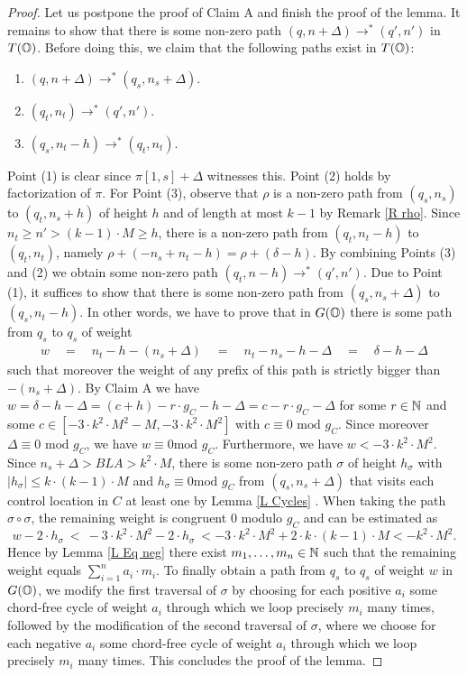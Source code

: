 \documentclass[times,envcountsame]{llncs}
\begin{document}
\begin{proof}
\noindent
Let us postpone the proof of Claim A and finish the proof of the lemma.
It remains to show that there is some non-zero path
$(q,n+\Delta)\rightarrow^*(q',n')$ in $T(\mathbb{O})$.
Before doing this, we claim that the following paths exist in $T(\mathbb{O})$:
\begin{enumerate}[(1)]
\item $(q,n+\Delta)\rightarrow^*(q_s,n_s+\Delta)$.
\item $(q_t,n_t)\rightarrow^*(q',n')$.
\item $(q_s,n_t-h)\rightarrow^*(q_t,n_t)$.
\end{enumerate}
Point (1) is clear since $\pi[1,s]+\Delta$ witnesses this.
Point (2) holds by factorization of $\pi$.
For Point (3), observe that $\rho$ is a non-zero path from $(q_s,n_s)$ to $(q_t,n_s+h)$
of height $h$ and of length at most $k-1$
by Remark \ref{R rho}.
Since $n_t\geq n'>(k-1)\cdot M\geq h$, there is a non-zero path
from $(q_t,n_t-h)$ to $(q_t,n_t)$, namely
$\rho+(-n_s+n_t-h)=\rho+(\delta-h)$.
 By combining Points (3) and (2) we obtain some non-zero path $(q_t,n-h)\rightarrow^*
(q',n')$.
Due to Point (1), it suffices to show that there is some
non-zero path from $(q_s,n_s+\Delta)$ to $(q_s,n_t-h)$.
In other words, we have to prove that in $G(\mathbb{O})$ there is some path from
$q_s$ to $q_s$ of weight
\begin{eqnarray*}
w\quad=\quad n_t-h-(n_s+\Delta)\quad=\quad n_t-n_s-h-\Delta\quad=\quad\delta-h-\Delta
\end{eqnarray*}
such that moreover the weight of any prefix of this path is strictly bigger
than $-(n_s+\Delta)$.
By Claim A we have $w=\delta-h-\Delta=(c+h)-r\cdot g_C-h-\Delta=c-r\cdot
g_C-\Delta$ for
some $r\in \mathbb{N}$ and some $c\in[-3\cdot k^2\cdot M^2-M,-3\cdot k^2\cdot M^2]$ with
$c\equiv 0\text{ mod } g_C$.
Since moreover $\Delta\equiv 0\text{ mod }g_C$, we have $w\equiv 0\text{
mod }g_C$.
Furthermore, we have $w<-3\cdot k^2\cdot M^2$.
Since $n_s+\Delta>BLA>k^2\cdot M$, there is some non-zero path $\sigma$ of height
$h_\sigma$ with $|h_\sigma|\leq k\cdot(k-1)\cdot M$ and $h_\sigma\equiv 0\text{
mod } g_C$
from $(q_s,n_s+\Delta)$ that visits each control location in $C$ at
least one by Lemma \ref{L Cycles} .
When taking the path $\sigma\circ\sigma$, the remaining weight is congruent $0$
modulo $g_C$ and can be estimated
as $$w-2\cdot h_\sigma\ <\ -3\cdot k^2\cdot M^2-2\cdot h_\sigma\ <
-3\cdot k^2\cdot M^2+2\cdot k\cdot (k-1)\cdot M<
-k^2\cdot M^2.
$$
Hence by Lemma \ref{L Eq neg} there exist $m_1,\ldots, m_n\in\mathbb{N}$ such that the
remaining weight equals $\sum_{i=1}^n a_i\cdot m_i$.
To finally obtain a path from $q_s$ to $q_s$ of weight $w$ in $G(\mathbb{O})$, we
modify the first traversal of $\sigma$ by choosing for each positive $a_i$ some
chord-free cycle of weight $a_i$ through which we loop precisely $m_i$ many times, followed by
the modification of the second traversal of $\sigma$, where we choose for each
negative $a_i$ some chord-free cycle of weight $a_i$ through which we loop
precisely $m_i$ many times.
This concludes the proof of the lemma.


\end{proof}
\end{document}
